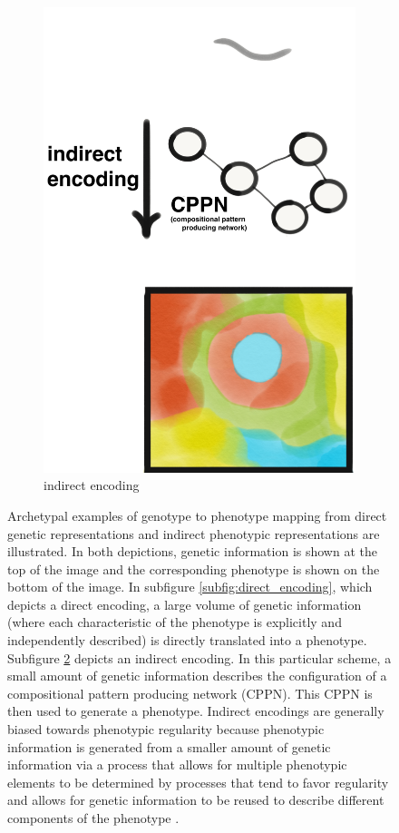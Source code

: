 \begin{figure}
\begin{subfigure}[b]{0.4\textwidth}
        \includegraphics[width=\textwidth]{img/regular_indirect_encoding.png}
        \caption{indirect encoding}
        \label{subfig:indirect_encoding}
    \end{subfigure}
    \hfill
  \captionsetup{singlelinecheck=off,justification=raggedright}
  \caption{Archetypal examples of genotype to phenotype mapping from direct genetic representations and indirect phenotypic representations are illustrated. In both depictions, genetic information is shown at the top of the image and the corresponding phenotype is shown on the bottom of the image. In subfigure \ref{subfig:direct_encoding}, which depicts a direct encoding, a large volume of genetic information (where each characteristic of the phenotype is explicitly and independently described) is directly translated into a phenotype. Subfigure \ref{subfig:indirect_encoding} depicts an indirect encoding. In this particular scheme, a small amount of genetic information describes the configuration of a compositional pattern producing network (CPPN). This CPPN is then used to generate a phenotype. Indirect encodings are generally biased towards phenotypic regularity because phenotypic information is generated from a smaller amount of genetic information via a process that allows for multiple phenotypic elements to be determined by processes that tend to favor regularity and allows for genetic information to be reused to describe different components of the phenotype  \cite{Clune2011OnRegularity}.}

\end{figure}
